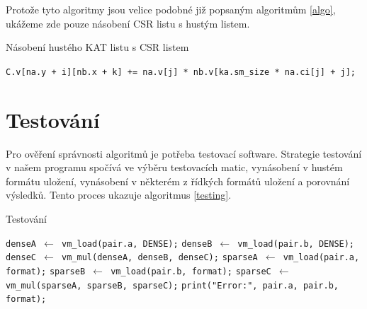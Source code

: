 Protože tyto algoritmy jsou velice podobné již popsaným algoritmům \ref{algo}, ukážeme zde pouze násobení CSR listu s hustým listem.

\begin{algorithm}[htb]
	\caption{Násobení hustého KAT listu s CSR listem}\label{kat-mmm-den-csr}
	\begin{algorithmic}[1]
					\State \texttt{C.v[na.y + i][nb.x + k] += na.v[j] * nb.v[ka.sm\_size * na.ci[j] + j];}
				\EndFor
			\EndFor
		\EndFor
		\EndProcedure
	\end{algorithmic}
\end{algorithm}



\section{Testování}

Pro ověření správnosti algoritmů je potřeba testovací software. Strategie testování v našem programu spočívá ve výběru testovacích matic, vynásobení v hustém formátu uložení, vynásobení v některém z řídkých formátů uložení a porovnání výsledků. Tento proces ukazuje algoritmus \ref{testing}.

\begin{algorithm}[htb]
	\caption{Testování}\label{testing}
	\begin{algorithmic}[1]
				\State \texttt{denseA $\gets$ vm\_load(pair.a, DENSE);}
				\State \texttt{denseB $\gets$ vm\_load(pair.b, DENSE);}
				\State \texttt{denseC $\gets$ vm\_mul(denseA, denseB, denseC);}
				\State \texttt{sparseA $\gets$ vm\_load(pair.a, format);}
				\State \texttt{sparseB $\gets$ vm\_load(pair.b, format);}
				\State \texttt{sparseC $\gets$ vm\_mul(sparseA, sparseB, sparseC);}
					\State \texttt{print("Error:", pair.a, pair.b, format);}
				\EndIf
			\EndFor
		\EndFor
		\EndProcedure
	\end{algorithmic}
\end{algorithm}

